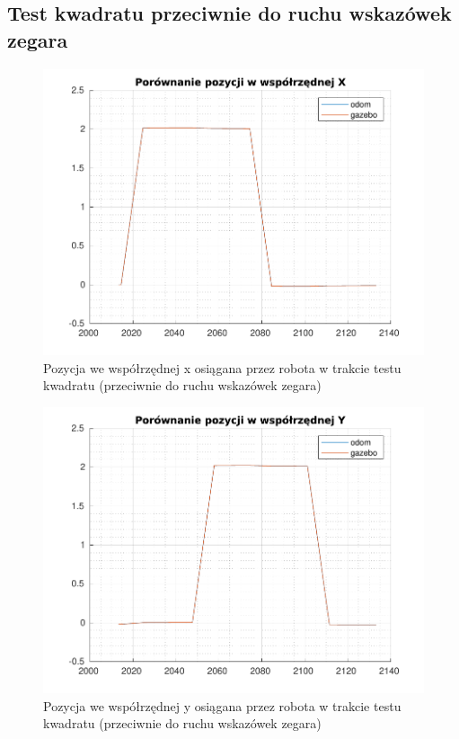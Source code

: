 \documentclass{mwrep}
\begin{document}
\subsection{Test kwadratu przeciwnie do ruchu wskazówek zegara}
\begin{figure}[H]
	\centering
	\includegraphics[scale=0.8]{./figures/lab1/lab1xccw.pdf}
	\caption{Pozycja we współrzędnej x osiągana przez robota w trakcie testu kwadratu (przeciwnie do ruchu wskazówek zegara)}
\end{figure}

\begin{figure}[H]
	\centering
	\includegraphics[scale=0.8]{./figures/lab1/lab1yccw.pdf}
	\caption{Pozycja we współrzędnej y osiągana przez robota w trakcie testu kwadratu (przeciwnie do ruchu wskazówek zegara)}
\end{figure}
\end{document}

